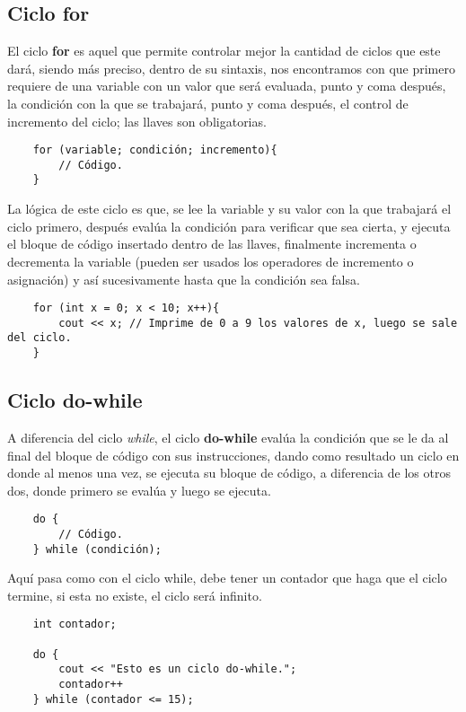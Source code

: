 \subsection{Ciclo for}

El ciclo \textbf{for} es aquel que permite controlar mejor la cantidad de ciclos que este dará, siendo más preciso, dentro de su sintaxis, nos encontramos con que primero requiere de una variable con un valor que será evaluada, punto y coma después, la condición con la que se trabajará, punto y coma después, el control de incremento del ciclo; las llaves son obligatorias.
\begin{lstlisting}
    for (variable; condición; incremento){
        // Código.
    }
\end{lstlisting}

La lógica de este ciclo es que, se lee la variable y su valor con la que trabajará el ciclo primero, después evalúa la condición para verificar que sea cierta, y ejecuta el bloque de código insertado dentro de las llaves, finalmente incrementa o decrementa la variable (pueden ser usados los operadores de incremento o asignación) y así sucesivamente hasta que la condición sea falsa.
\begin{lstlisting}
    for (int x = 0; x < 10; x++){
        cout << x; // Imprime de 0 a 9 los valores de x, luego se sale del ciclo.
    }
\end{lstlisting}


\subsection{Ciclo do-while}

A diferencia del ciclo \textit{while}, el ciclo \textbf{do-while} evalúa la condición que se le da al final del bloque de código con sus instrucciones, dando como resultado un ciclo en donde al menos una vez, se ejecuta su bloque de código, a diferencia de los otros dos, donde primero se evalúa y luego se ejecuta.
\begin{lstlisting}
    do {
        // Código.
    } while (condición);
\end{lstlisting}

Aquí pasa como con el ciclo while, debe tener un contador que haga que el ciclo termine, si esta no existe, el ciclo será infinito.
\begin{lstlisting}
    int contador;
    
    do {
        cout << "Esto es un ciclo do-while.";
        contador++
    } while (contador <= 15);
\end{lstlisting}



